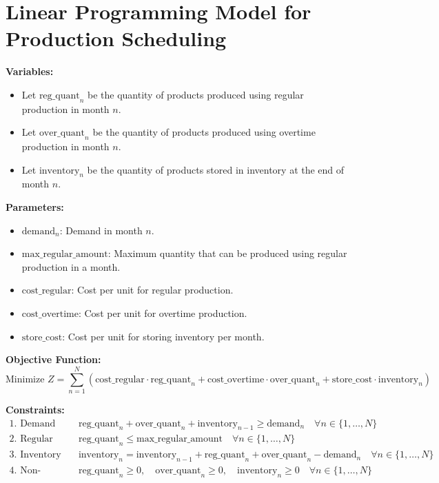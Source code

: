 \documentclass{article}
\begin{document}
\section*{Linear Programming Model for Production Scheduling}

\textbf{Variables:}
\begin{itemize}
    \item Let \( \text{reg\_quant}_{n} \) be the quantity of products produced using regular production in month \( n \).
    \item Let \( \text{over\_quant}_{n} \) be the quantity of products produced using overtime production in month \( n \).
    \item Let \( \text{inventory}_{n} \) be the quantity of products stored in inventory at the end of month \( n \).
\end{itemize}

\textbf{Parameters:}
\begin{itemize}
    \item \( \text{demand}_{n} \): Demand in month \( n \).
    \item \( \text{max\_regular\_amount} \): Maximum quantity that can be produced using regular production in a month.
    \item \( \text{cost\_regular} \): Cost per unit for regular production.
    \item \( \text{cost\_overtime} \): Cost per unit for overtime production.
    \item \( \text{store\_cost} \): Cost per unit for storing inventory per month.
\end{itemize}

\textbf{Objective Function:}
\[
\text{Minimize } Z = \sum_{n=1}^{N} \left( \text{cost\_regular} \cdot \text{reg\_quant}_{n} + \text{cost\_overtime} \cdot \text{over\_quant}_{n} + \text{store\_cost} \cdot \text{inventory}_{n} \right)
\]

\textbf{Constraints:}
\begin{align*}
\text{1. Demand Satisfaction:} & \quad \text{reg\_quant}_{n} + \text{over\_quant}_{n} + \text{inventory}_{n-1} \geq \text{demand}_{n} \quad \forall n \in \{1, \ldots, N\} \\
\text{2. Regular Production Limit:} & \quad \text{reg\_quant}_{n} \leq \text{max\_regular\_amount} \quad \forall n \in \{1, \ldots, N\} \\
\text{3. Inventory Balance:} & \quad \text{inventory}_{n} = \text{inventory}_{n-1} + \text{reg\_quant}_{n} + \text{over\_quant}_{n} - \text{demand}_{n} \quad \forall n \in \{1, \ldots, N\} \\
\text{4. Non-negativity:} & \quad \text{reg\_quant}_{n} \geq 0, \quad \text{over\_quant}_{n} \geq 0, \quad \text{inventory}_{n} \geq 0 \quad \forall n \in \{1, \ldots, N\}
\end{align*}
\end{document}
